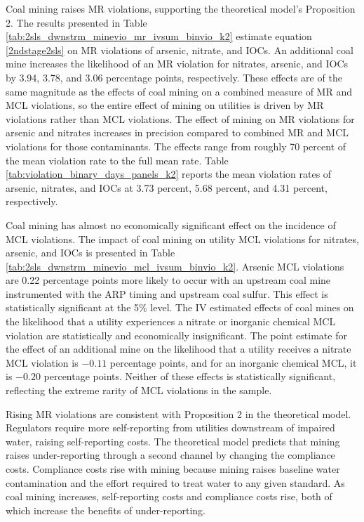 \documentclass[12pt]{article}
\begin{document}
Coal mining raises MR violations, supporting the theoretical model's Proposition 2. The results presented in Table \ref{tab:2sls_dwnstrm_minevio_mr_ivsum_binvio_k2} estimate equation \ref{2ndstage2sls} on MR violations of arsenic, nitrate, and IOCs. An additional coal mine increases the likelihood of an MR violation for nitrates, arsenic, and IOCs by 3.94, 3.78, and 3.06 percentage points, respectively. These effects are of the same magnitude as the effects of coal mining on a combined measure of MR and MCL violations, so the entire effect of mining on utilities is driven by MR violations rather than MCL violations. The effect of mining on MR violations for arsenic and nitrates increases in precision compared to combined MR and MCL violations for those contaminants. The effects range from roughly 70 percent of the mean violation rate to the full mean rate. Table \ref{tab:violation_binary_days_panels_k2} reports the mean violation rates of arsenic, nitrates, and IOCs at 3.73 percent, 5.68 percent, and 4.31 percent, respectively.

Coal mining has almost no economically significant effect on the incidence of MCL violations. The impact of coal mining on utility MCL violations for nitrates, arsenic, and IOCs is presented in Table \ref{tab:2sls_dwnstrm_minevio_mcl_ivsum_binvio_k2}. Arsenic MCL violations are 0.22 percentage points more likely to occur with an upstream coal mine instrumented with the ARP timing and upstream coal sulfur. This effect is statistically significant at the 5\% level. The IV estimated effects of coal mines on the likelihood that a utility experiences a nitrate or inorganic chemical MCL violation are statistically and economically insignificant. The point estimate for the effect of an additional mine on the likelihood that a utility receives a nitrate MCL violation is $-0.11$ percentage points, and for an inorganic chemical MCL, it is $-0.20$ percentage points. Neither of these effects is statistically significant, reflecting the extreme rarity of MCL violations in the sample.

Rising MR violations are consistent with Proposition 2 in the theoretical model. Regulators require more self-reporting from utilities downstream of impaired water, raising self-reporting costs. The theoretical model predicts that mining raises under-reporting through a second channel by changing the compliance costs. Compliance costs rise with mining because mining raises baseline water contamination and the effort required to treat water to any given standard. As coal mining increases, self-reporting costs and compliance costs rise, both of which increase the benefits of under-reporting. 
\end{document}
